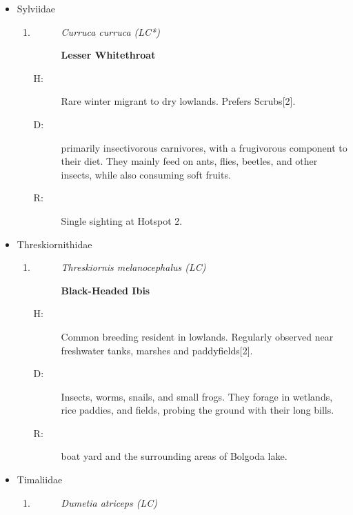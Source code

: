 \begin{itemize}
\begin{enumerate}
\begin{description}
Throughout the university premises.%
\end{description}%
\end{enumerate}%
\item%
Sylviidae%
\begin{enumerate}%
\item%
\begin{description}%
\item[]%
\textit{Curruca curruca (LC*)}%
\item[]%
\textbf{Lesser Whitethroat}%
\end{description}%
\begin{description}%
\item[H: ]%
Rare winter migrant to dry lowlands. Prefers Scrubs{[}2{]}.%
\item[D: ]%
primarily insectivorous carnivores, with a frugivorous component to their diet. They mainly feed on ants, flies, beetles, and other insects, while also consuming soft fruits.%
\item[R: ]%
Single sighting at Hotspot 2.%
\end{description}%
\end{enumerate}%
\item%
Threskiornithidae%
\begin{enumerate}%
\item%
\begin{description}%
\item[]%
\textit{Threskiornis melanocephalus (LC)}%
\item[]%
\textbf{Black{-}Headed Ibis}%
\end{description}%
\begin{description}%
\item[H: ]%
Common breeding resident in lowlands. Regularly observed near freshwater tanks, marshes and paddyfields{[}2{]}.%
\item[D: ]%
Insects, worms, snails, and small frogs. They forage in wetlands, rice paddies, and fields, probing the ground with their long bills.%
\item[R: ]%
boat yard and the surrounding areas of Bolgoda lake.%
\end{description}%
\end{enumerate}%
\item%
Timaliidae%
\begin{enumerate}%
\item%
\begin{description}%
\item[]%
\textit{Dumetia atriceps (LC)}%

\end{description}
\end{enumerate}
\end{itemize}
